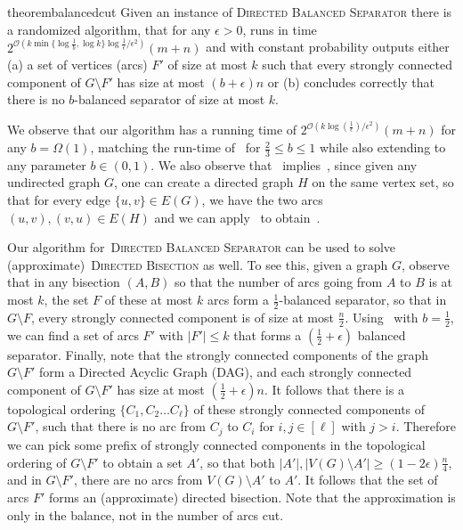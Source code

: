 \documentclass[11pt]{article}
\newcommand{\OO}{\mathcal{O}}
\newcommand{\DBS}{{\textsc{Directed Bisection}}{}}
\newcommand{\DB}{{\textsc{Directed Balanced Separator}}}
\begin{document}
\begin{restatable}{theorem}{balancedcut}\label{thm:main}
Given an instance of \DB{} there is a randomized algorithm, that for any $\epsilon > 0$, runs in time $2^{\OO\left(k \min\{\log\frac{1}{b}, \log k\}\log \frac{1}{\epsilon}/\epsilon^2 \right)}(m + n)$ and with constant probability outputs either (a) a set of vertices (arcs) $F'$ of size at most $k$ such that every strongly connected component of $G \setminus F'$ has size at most $(b + \epsilon)n$ or (b) concludes correctly that there is no $b$-balanced separator of size at most $k$.
\end{restatable}

We observe that our algorithm has a running time of $2^{\OO\left(k\log \left(\frac{1}{\epsilon}\right)/{\epsilon^2}  \right)}(m + n)$ for any $b = \Omega(1)$, matching the run-time of~ for $\frac{2}{3} \leq b \leq 1$ while also extending to any parameter $b \in (0,1)$. We also observe that~ implies~, since given any undirected graph $G$, one can create a directed graph $H$ on the same vertex set, so that for every edge $\{u,v\} \in E(G)$, we have the two arcs $(u,v), (v,u) \in E(H)$ and we can apply~ to obtain~.  






Our algorithm for~\DB{} can be used to solve (approximate)~\DBS{} as well. To see this, given a graph $G$, observe that in any bisection $(A,B)$ so that the number of arcs going from $A$ to $B$ is at most $k$, the set $F$ of these at most $k$ arcs form a $\frac{1}{2}$-balanced separator, so that in $G \setminus F$, every strongly connected component is of size at most $\frac{n}{2}$. Using~ with $b = \frac{1}{2}$, we can find a set of arcs $F'$ with $|F'| \leq k$ that forms a $(\frac{1}{2}+\epsilon)$ balanced separator. Finally, note that the strongly connected components of the graph $G \setminus F'$ form a Directed Acyclic Graph (DAG), and each strongly connected component of $G \setminus F'$ has size at most $(\frac{1}{2} + \epsilon)n$. It follows that there is a topological ordering $\{C_1, C_2 \ldots C_{\ell}\}$ of these strongly connected components of $G \setminus F'$, such that there is no arc from $C_j$ to $C_i$ for $i, j \in [\ell]$ with $j > i$. Therefore we can pick some prefix of strongly connected components in the topological ordering of $G 
\setminus F'$ to obtain a set $A'$, so that both $|A'|, |V(G) \setminus A'| \geq (1 - 2\epsilon)\frac{n}{4}$, and in $G \setminus F'$, there are no arcs from $V(G) \setminus A'$ to $A'$. It follows that the set of arcs $F'$ forms an (approximate) directed bisection. Note that the approximation is only in the balance, not in the number of arcs cut.
\end{document}

